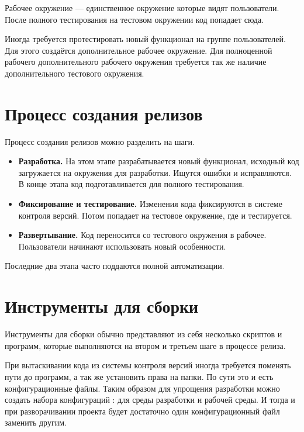 Рабочее окружение --- единственное окружение которые видят пользователи. После полного тестирования на тестовом окружении код попадает сюда.

Иногда требуется протестировать новый функционал на группе пользователей. Для этого создаётся дополнительное рабочее окружение. Для полноценной рабочего дополнительного рабочего окружения требуется так же наличие дополнительного тестового окружения.


\section{ Процесс создания релизов } \label{sect2_10}

Процесс создания релизов можно разделить на шаги.

\begin{itemize}

\item \textbf{Разработка.} На этом этапе разрабатывается новый функционал, исходный код загружается на окружения для разработки. Ищутся ошибки и исправляются. В конце этапа код подготавливается для полного тестирования.

\item \textbf{Фиксирование и тестирование.}  Изменения кода фиксируются в системе контроля версий. Потом попадает на тестовое окружение, где и тестируется.

\item \textbf{ Развертывание.} Код переносится со тестового окружения в рабочее. Пользователи начинают использовать новый особенности. 

\end{itemize}

Последние два этапа часто поддаются полной автоматизации.

\section{ Инструменты для сборки } \label{sect2_11}

Инструменты для сборки обычно представляют из себя несколько скриптов и программ, которые выполняются на втором и третьем шаге в процессе релиза.


При вытаскивании кода из системы контроля версий иногда требуется поменять пути до программ, а так же установить права на папки. По сути это и есть конфигурационные файлы. Таким образом для упрощения разработки можно создать  набора конфигураций : для среды разработки и рабочей среды.  И тогда и при разворачивании проекта будет достаточно один конфигурационный файл заменить другим.

